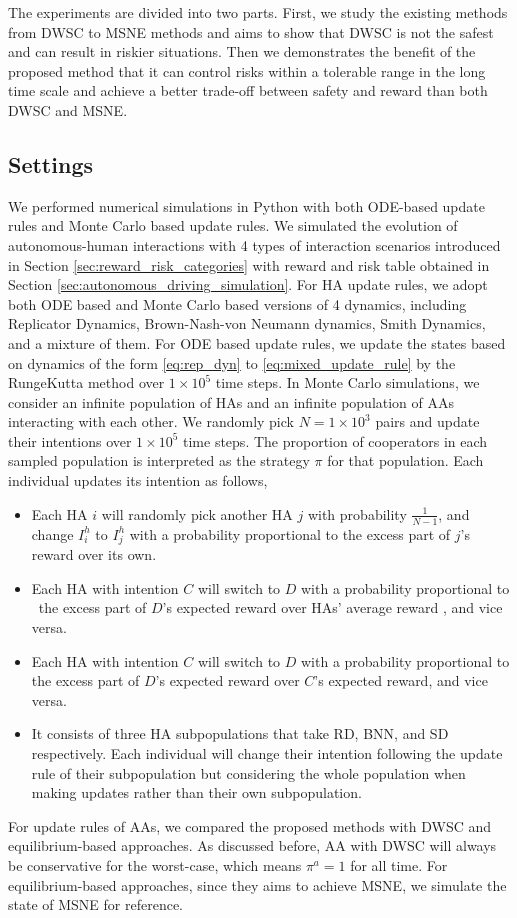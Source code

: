 \documentclass[letterpaper]{article} %
\begin{document}
The experiments are divided into two parts. First, we study the existing methods from DWSC to MSNE methods and aims to show that DWSC is not the safest and can result in riskier situations. Then we demonstrates the benefit of the proposed method that it can control risks within a tolerable range in the long time scale and achieve a better trade-off between safety and reward than both DWSC and MSNE.

\subsection{Settings}
We performed numerical simulations in Python with both ODE-based update rules and Monte Carlo based update rules.
We simulated the evolution of autonomous-human interactions with 4 types of interaction scenarios
introduced in Section \ref{sec:reward_risk_categories}
with reward and risk table obtained in Section
\ref{sec:autonomous_driving_simulation}. For HA update rules, we adopt both ODE based and Monte Carlo based versions of 4 dynamics, including Replicator Dynamics, Brown-Nash-von Neumann dynamics, Smith Dynamics, and a mixture of them.
For ODE based update rules, we update the states based on dynamics of the form \eqref{eq:rep_dyn} to \eqref{eq:mixed_update_rule} by the RungeKutta method \cite{runge1895numerische} over $1\times10^5$ time steps.
In Monte Carlo simulations, we consider an infinite population of HAs and an infinite population of AAs interacting with each other. We randomly pick $N=1\times10^3$ pairs and update their intentions over $1\times10^5$ time steps. The proportion of cooperators in each sampled population is interpreted as the strategy $\pi$ for that population. Each individual updates its intention as follows,
\begin{itemize}
    \item {} Each HA $i$ will randomly pick another HA $j$ with probability $\frac{1}{N-1}$, and change $I^h_i$ to $I^h_j$ with a probability proportional to the excess part of $j$'s reward over its own.
    \item {} Each HA
    with intention $C$ will switch to $D$ with a probability proportional to \
    the excess part of $D$'s expected reward over HAs' average reward
    , and vice versa.
    \item {} Each HA with intention $C$ will switch to $D$ with a probability proportional to the excess part of $D$'s expected reward over $C$'s expected reward, and vice versa.
    \item \text{Mixed Dynamics:} It consists of three HA subpopulations that take RD, BNN, and SD respectively. Each individual will change their intention following the update rule of their subpopulation but considering the whole population when making updates rather than their own subpopulation.
\end{itemize}
For update rules of AAs, we compared the proposed methods with
DWSC and equilibrium-based approaches. As discussed before, AA with DWSC will always be conservative for the worst-case, which means $\pi^a=1$ for all time. For equilibrium-based approaches, since they aims to achieve MSNE, we simulate the state of MSNE for reference.
\end{document}
